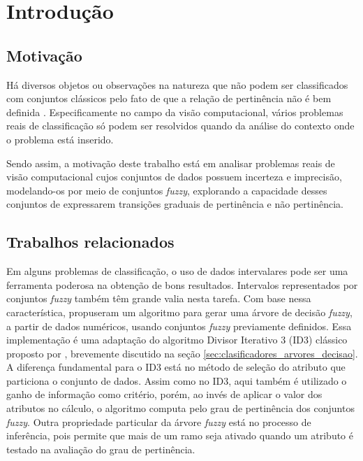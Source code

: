 \chapter{Introdução}
\label{cap:introducao}


\section{Motivação}
\label{sec:consideracoes_preliminares}

Há diversos objetos ou observações na natureza que não podem ser classificados com conjuntos clássicos pelo fato de que a relação de pertinência não é bem definida \citep{pedrycz:98}. Especificamente no campo da visão computacional, vários problemas reais de classificação só podem ser resolvidos quando da análise do contexto onde o problema está inserido.

Sendo assim, a motivação deste trabalho está em analisar problemas reais de visão computacional cujos conjuntos de dados possuem incerteza e imprecisão, modelando-os por meio de conjuntos \emph{fuzzy}, explorando a capacidade desses conjuntos de expressarem transições graduais de pertinência e não pertinência.


\section{Trabalhos relacionados}
\label{sec:trabalhos_relacionados}

Em alguns problemas de classificação, o uso de dados intervalares pode ser uma ferramenta poderosa na obtenção de bons resultados. Intervalos representados por conjuntos \emph{fuzzy} também têm grande valia nesta tarefa. Com base nessa característica, \citet{umano:94} propuseram um algoritmo para gerar uma árvore de decisão \emph{fuzzy}, a partir de dados numéricos, usando conjuntos \emph{fuzzy} previamente definidos. Essa implementação é uma adaptação do algoritmo Divisor Iterativo 3 (ID3) clássico proposto por \citet{quinlan:86}, brevemente discutido na seção \ref{sec:clasificadores_arvores_decisao}. A diferença fundamental para o ID3 está no método de seleção do atributo que particiona o conjunto de dados. Assim como no ID3, aqui também é utilizado o ganho de informação como critério, porém, ao invés de aplicar o valor dos atributos no cálculo, o algoritmo computa pelo grau de pertinência dos conjuntos \emph{fuzzy}. Outra propriedade particular da árvore \emph{fuzzy} está no processo de inferência, pois permite que mais de um ramo seja ativado quando um atributo é testado na avaliação do grau de pertinência.


